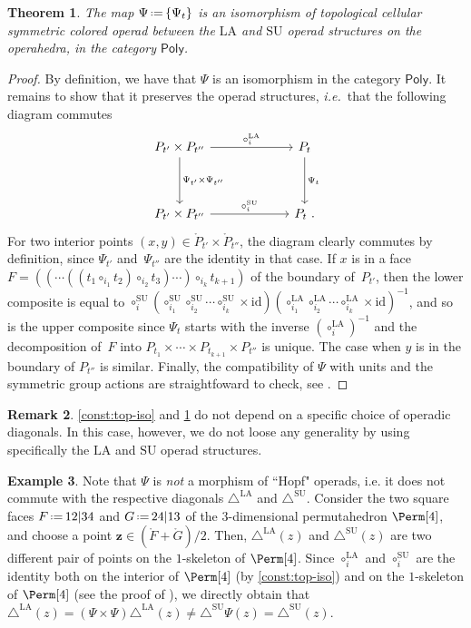 \documentclass{amsart}
\newtheorem{theorem}{Theorem}[section]
\theoremstyle{definition}
\newtheorem{example}[theorem]{Example}
\newtheorem{remark}[theorem]{Remark}
\renewcommand{\b}[1]{{\boldsymbol{#1}}} %
\newcommand{\eqdef}{\mbox{\,\raisebox{0.2ex}{\scriptsize\ensuremath{\mathrm:}}\ensuremath{=}\,}} %
\newcommand{\ie}{\textit{i.e.}~} %
\renewcommand{\b}[1]{\boldsymbol{#1}} %
\newcommand{\SU}{\mathrm{SU}}
\newcommand{\LA}{\mathrm{LA}}
\newcommand{\SUD}{\triangle^{\mathrm{SU}}}
\newcommand{\LAD}{\triangle^{\mathrm{LA}}}
\newcommand{\PolySub}{\mathsf{Poly}}
\newcommand{\id}{\mathrm{id}}
\begin{document}
\begin{theorem}
	\label{thm:top-iso}
	The map $\Psi \eqdef \{\Psi_t\}$ is an isomorphism of topological cellular symmetric colored operad between the $\LA$ and $\SU$ operad structures on the operahedra, in the category $\PolySub$.
\end{theorem}

\begin{proof}
	By definition, we have that $\Psi$ is an isomorphism in the category $\PolySub$. 
	It remains to show that it preserves the operad structures, \ie that the following diagram commutes
	\[
	\vcenter{\hbox{
	\begin{tikzcd}[column sep=2.2cm, row sep=1.3cm]
	P_{t'}\times P_{t''}
	\arrow[r,  "\circ_i^\LA"] 
	\arrow[d,  "\Psi_{t'}\times\Psi_{t''}"]
	& P_{t} \arrow[d,  "\Psi_t"] \\
	P_{t'}\times P_{t''}  
	\arrow[r,  "\circ_i^\SU"]
	& P_{t}\ .
	\end{tikzcd}
	}}\]
	For two interior points $(x,y) \in \mathring P_{t'}\times \mathring P_{t''}$, the diagram clearly commutes by definition, since $\Psi_{t'}$ and~$\Psi_{t''}$ are the identity in that case. 
	If $x$ is in a face $F=((\cdots((t_1 \circ_{i_1} t_2) \circ_{i_2} t_3) \cdots )\circ_{i_k} t_{k+1})$ of the boundary of~$P_{t'}$, then the lower composite is equal to $\circ_i^\SU (\circ_{i_1}^\SU \circ_{i_2}^\SU \cdots \circ_{i_k}^\SU \times \id)(\circ_{i_1}^\LA \circ_{i_2}^\LA \cdots \circ_{i_k}^\LA \times \id)^{-1}$, and so is the upper composite since $\Psi_t$ starts with the inverse $(\circ_i^\LA)^{-1}$ and the decomposition of~$F$ into $P_{t_1} \times \cdots \times P_{t_{k+1}} \times P_{t''}$ is unique.
	The case when $y$ is in the boundary of $P_{t''}$ is similar.  
	Finally, the compatibility of $\Psi$ with units and the symmetric group actions are straightfoward to check, see \cite[Def.~4.17 \& Thm.~4.18]{LaplanteAnfossi}.
\end{proof}

\begin{remark}
	\cref{const:top-iso} and \cref{thm:top-iso} do not depend on a specific choice of operadic diagonals.
	In this case, however, we do not loose any generality by using specifically the $\LA$ and $\SU$ operad structures. 
\end{remark}

\begin{example}
Note that $\Psi$ is \emph{not} a morphism of ``Hopf" operads, i.e. it does not commute with the respective diagonals $\LAD$ and $\SUD$. 
Consider the two square faces $F \eqdef 12|34$ and $G \eqdef 24|13$ of the $3$-dimensional permutahedron $\Perm[4]$, and choose a point $\b z \in (\mathring F + \mathring G)/2$.
Then, $\LAD(z)$ and $\SUD(z)$ are two different pair of points on the $1$-skeleton of $\Perm[4]$. 
Since $\circ_i^\LA$ and $\circ_i^\SU$ are the identity both on the interior of $\Perm[4]$ (by \cref{const:top-iso}) and on the $1$-skeleton of $\Perm[4]$ (see the proof of \cite[Prop. 7]{MasudaThomasTonksVallette}), we directly obtain that $\LAD(z)=(\Psi \times \Psi)\LAD(z) \neq \SUD \Psi(z)=\SUD(z)$. 
\end{example}
\end{document}
